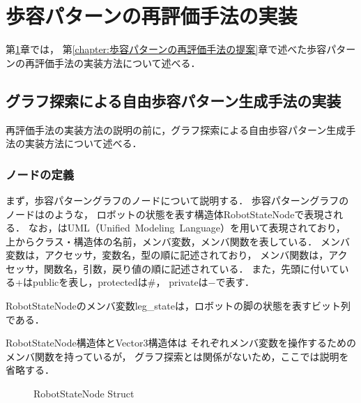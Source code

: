 ﻿%

\chapter{歩容パターンの再評価手法の実装}\label{chapter:歩容パターンの再評価手法の実装}
第\ref{chapter:歩容パターンの再評価手法の実装}章では，
第\ref{chapter:歩容パターンの再評価手法の提案}章で述べた歩容パターンの再評価手法の実装方法について述べる．

\section{グラフ探索による自由歩容パターン生成手法の実装}
再評価手法の実装方法の説明の前に，グラフ探索による自由歩容パターン生成手法の実装方法について述べる．

\subsection{ノードの定義}
まず，歩容パターングラフのノードについて説明する．
歩容パターングラフのノードはのような，
ロボットの状態を表す構造体RobotStateNodeで表現される．
なお，はUML（Unified~Modeling~Language）を用いて表現されており，
上からクラス・構造体の名前，メンバ変数，メンバ関数を表している．
メンバ変数は，アクセッサ，変数名，型の順に記述されており，
メンバ関数は，アクセッサ，関数名，引数，戻り値の順に記述されている．
また，先頭に付いている+はpublicを表し，protectedは\#，
privateは$-$で表す．

RobotStateNodeのメンバ変数leg\_stateは，ロボットの脚の状態を表すビット列である．

RobotStateNode構造体とVector3構造体は
それぞれメンバ変数を操作するためのメンバ関数を持っているが，
グラフ探索とは関係がないため，ここでは説明を省略する．

\begin{figure}[htbp]
  \centering
  \caption{RobotStateNode Struct}
  \label{fig:robot_state_node}  %
\end{figure}

